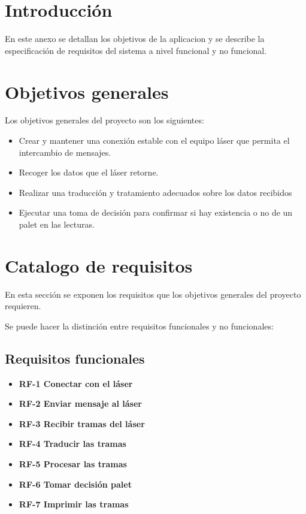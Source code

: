 
\section{Introducción}
En este anexo se detallan los objetivos de la aplicacion y se describe la especificación de requisitos del sistema a nivel funcional y no funcional.

\section{Objetivos generales}
Los objetivos generales del proyecto son los siguientes:

\begin{itemize}
\tightlist
\item
  Crear y mantener una conexión estable con el equipo láser que permita el intercambio de mensajes.
\item
  Recoger los datos que el láser retorne.
\item
  Realizar una traducción y tratamiento adecuados sobre los datos recibidos
\item
  Ejecutar una toma de decisión para confirmar si hay existencia o no de un palet en las lecturas.
\end{itemize}

\section{Catalogo de requisitos}
En esta sección se exponen los requisitos que los objetivos generales del proyecto requieren.



Se puede hacer la distinción entre requisitos funcionales y no funcionales:\\

\subsection{Requisitos funcionales}


\begin{itemize}
	\item \textbf{RF-1 Conectar con el láser}
	\item \textbf{RF-2 Enviar mensaje al láser}
	\item \textbf{RF-3 Recibir tramas del láser}
	\item \textbf{RF-4 Traducir las tramas }
	\item \textbf{RF-5 Procesar las tramas}
	\item \textbf{RF-6 Tomar decisión palet}
	\item \textbf{RF-7 Imprimir las tramas}
		
\end{itemize}

